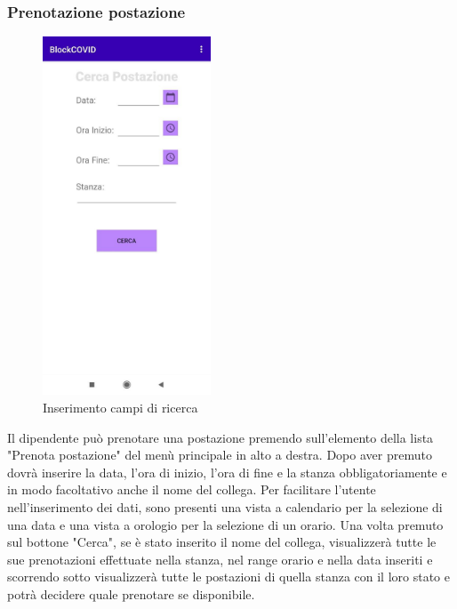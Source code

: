 	\subsubsection{Prenotazione postazione}
	\begin{figure}[H]
		\centering
		\includegraphics[width=5cm]{res/images/cerca.png}
		\caption{Inserimento campi di ricerca}
	\end{figure}
	Il dipendente può prenotare una postazione premendo sull'elemento della lista "Prenota postazione" del menù principale in alto a destra.
	Dopo aver premuto dovrà inserire la data, l'ora di inizio, l'ora di fine e la stanza obbligatoriamente e in modo facoltativo anche il nome del collega. Per facilitare l'utente nell'inserimento dei dati, sono presenti una vista a calendario per la selezione di una data e una vista a orologio per la selezione di un orario. Una volta premuto sul bottone "Cerca", se è stato inserito il nome del collega, visualizzerà tutte le sue prenotazioni effettuate nella stanza, nel range orario e nella data inseriti e scorrendo sotto visualizzerà tutte le postazioni di quella stanza con il loro stato e potrà decidere quale prenotare se disponibile.
